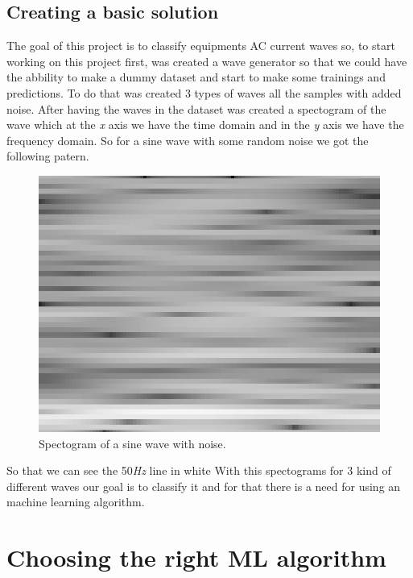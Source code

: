 \documentclass[conference]{IEEEtran}
\begin{document}
\subsection{Creating a basic solution}

The goal of this project is to classify equipments AC current waves so, to start working on this project first, was created a wave generator so that we could have the abbility to make a dummy dataset and start to make some trainings and predictions. To do that was created 3 types of waves all the samples with added noise. After having the waves in the dataset was created a spectogram of the wave which at the {\it x} axis we have the time domain and in the {\it y} axis we have the frequency domain. So for a sine wave with some random noise we got the following patern.
\begin{figure}[htbp]
\centerline{\includegraphics[scale=0.2]{specgramsinwave.png}}
\caption{Spectogram of a sine wave with noise.}
\label{fig}
\end{figure}
So that we can see the 50{\it Hz} line in white
With this spectograms for 3 kind of different waves our goal is to classify it and for that there is a need for using an machine learning algorithm.
\section{Choosing the right ML algorithm}
\end{document}
